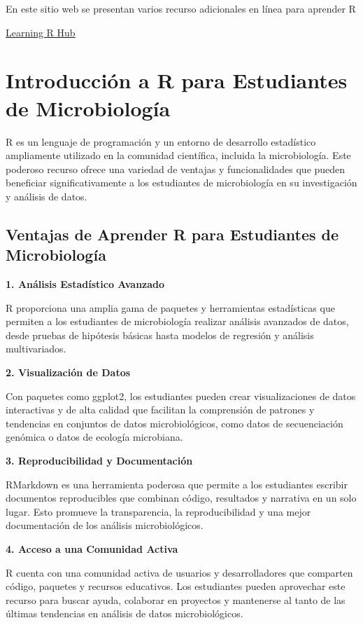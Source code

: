 \documentclass[
]{book}
\begin{document}
En este sitio web se presentan varios recurso adicionales en línea para aprender R

\href{https://github.com/robertoalvarezm/Learning_R_Hub}{Learning R Hub}

\section{Introducción a R para Estudiantes de Microbiología}\label{introducciuxf3n-a-r-para-estudiantes-de-microbiologuxeda}

R es un lenguaje de programación y un entorno de desarrollo estadístico ampliamente utilizado en la comunidad científica, incluida la microbiología. Este poderoso recurso ofrece una variedad de ventajas y funcionalidades que pueden beneficiar significativamente a los estudiantes de microbiología en su investigación y análisis de datos.

\subsection{Ventajas de Aprender R para Estudiantes de Microbiología}\label{ventajas-de-aprender-r-para-estudiantes-de-microbiologuxeda}

\textbf{1. Análisis Estadístico Avanzado}

R proporciona una amplia gama de paquetes y herramientas estadísticas que permiten a los estudiantes de microbiología realizar análisis avanzados de datos, desde pruebas de hipótesis básicas hasta modelos de regresión y análisis multivariados.

\textbf{2. Visualización de Datos}

Con paquetes como ggplot2, los estudiantes pueden crear visualizaciones de datos interactivas y de alta calidad que facilitan la comprensión de patrones y tendencias en conjuntos de datos microbiológicos, como datos de secuenciación genómica o datos de ecología microbiana.

\textbf{3. Reproducibilidad y Documentación}

RMarkdown es una herramienta poderosa que permite a los estudiantes escribir documentos reproducibles que combinan código, resultados y narrativa en un solo lugar. Esto promueve la transparencia, la reproducibilidad y una mejor documentación de los análisis microbiológicos.

\textbf{4. Acceso a una Comunidad Activa}

R cuenta con una comunidad activa de usuarios y desarrolladores que comparten código, paquetes y recursos educativos. Los estudiantes pueden aprovechar este recurso para buscar ayuda, colaborar en proyectos y mantenerse al tanto de las últimas tendencias en análisis de datos microbiológicos.
\end{document}
